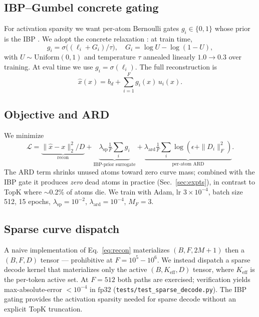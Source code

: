 \documentclass[10pt,twocolumn]{article}
\begin{document}
\subsection{IBP--Gumbel concrete gating}

For activation sparsity we want per-atom Bernoulli gates $g_i \in \{0,1\}$ whose
prior is the IBP \cite{griffiths2011ibp}. We adopt the concrete relaxation
\cite{jang2017categorical}: at train time,
\[
g_i = \sigma\!\bigl((\ell_i + G_i)/\tau\bigr), \quad G_i = \log U - \log(1-U),
\]
with $U \sim \mathrm{Uniform}(0,1)$ and temperature $\tau$ annealed linearly
$1.0 \to 0.3$ over training. At eval time we use $g_i = \sigma(\ell_i)$. The full
reconstruction is
\begin{equation}
\hat{x}(x) = b_d + \sum_{i=1}^{F} g_i(x) \, u_i(x).
\label{eq:recon}
\end{equation}

\subsection{Objective and ARD}

We minimize
\[
\mathcal{L} = \underbrace{\|\hat{x}-x\|_2^2/D}_{\text{recon}}
+ \underbrace{\lambda_{\text{sp}} \tfrac{1}{F}\sum_i g_i}_{\text{IBP-prior surrogate}}
+ \underbrace{\lambda_{\text{ard}} \tfrac{1}{F}\sum_i \log(\epsilon + \|D_i\|_F^2)}_{\text{per-atom ARD}}.
\]
The ARD term \cite{neal1996bayesian,tipping1999ppca} shrinks unused atoms toward
zero curve mass; combined with the IBP gate it produces \emph{zero} dead atoms in
practice (Sec.~\ref{sec:expts}), in contrast to TopK where $\sim$0.2\% of atoms
die. We train with Adam, lr $3\!\times\!10^{-4}$, batch size 512, 15 epochs,
$\lambda_{\text{sp}}{=}10^{-2}$, $\lambda_{\text{ard}}{=}10^{-4}$, $M_F{=}3$.

\subsection{Sparse curve dispatch}

A naive implementation of Eq.~\ref{eq:recon} materializes
$(B,F,2M{+}1)$ then a $(B,F,D)$ tensor --- prohibitive at $F{=}10^5{-}10^6$.
We instead dispatch a sparse decode kernel that materializes only the active
$(B, K_{\text{eff}}, D)$ tensor, where $K_{\text{eff}}$ is the per-token active
set. At $F{=}512$ both paths are exercised; verification yields
max-absolute-error $<10^{-4}$ in $\mathrm{fp32}$ (\texttt{tests/test\_sparse\_decode.py}).
The IBP gating provides the activation sparsity needed for sparse decode
without an explicit TopK truncation.
\end{document}
